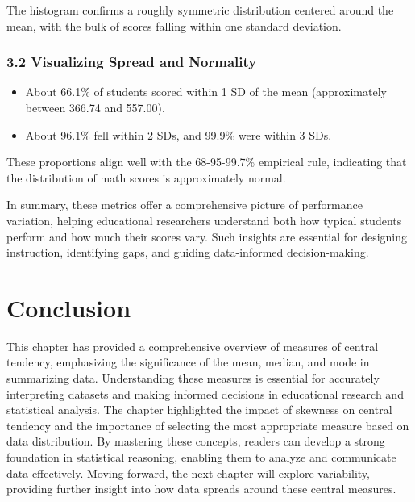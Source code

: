 \documentclass[
  letterpaper,
  DIV=11,
  numbers=noendperiod]{scrreprt}
\begin{document}
The histogram confirms a roughly symmetric distribution centered around
the mean, with the bulk of scores falling within one standard deviation.

\subsection*{3.2 Visualizing Spread and
Normality}\label{visualizing-spread-and-normality-1}

\begin{itemize}
\item
  About 66.1\% of students scored within 1 SD of the mean (approximately
  between 366.74 and 557.00).
\item
  About 96.1\% fell within 2 SDs, and 99.9\% were within 3 SDs.
\end{itemize}

These proportions align well with the 68-95-99.7\% empirical rule,
indicating that the distribution of math scores is approximately normal.

In summary, these metrics offer a comprehensive picture of performance
variation, helping educational researchers understand both how typical
students perform and how much their scores vary. Such insights are
essential for designing instruction, identifying gaps, and guiding
data-informed decision-making.


\chapter*{Conclusion}\label{conclusion-2}


This chapter has provided a comprehensive overview of measures of
central tendency, emphasizing the significance of the mean, median, and
mode in summarizing data. Understanding these measures is essential for
accurately interpreting datasets and making informed decisions in
educational research and statistical analysis. The chapter highlighted
the impact of skewness on central tendency and the importance of
selecting the most appropriate measure based on data distribution. By
mastering these concepts, readers can develop a strong foundation in
statistical reasoning, enabling them to analyze and communicate data
effectively. Moving forward, the next chapter will explore variability,
providing further insight into how data spreads around these central
measures.
\end{document}
